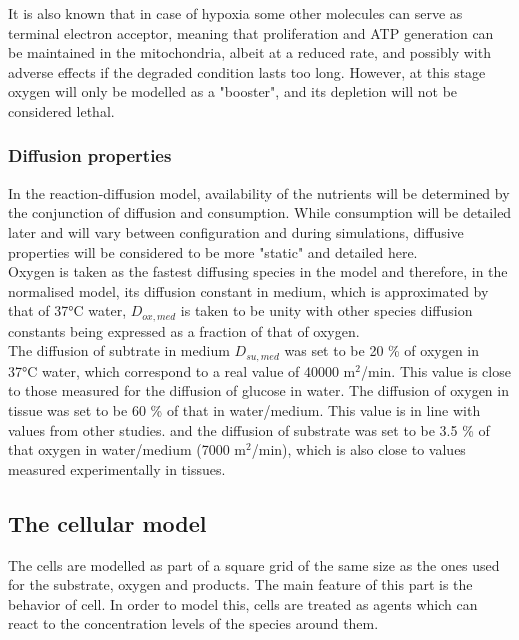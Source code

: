 \documentclass[11pt,a4paper]{article}
\begin{document}
It is also known that in case of hypoxia some other molecules can serve as terminal electron acceptor, meaning that proliferation and ATP generation can be maintained in the mitochondria, albeit at a reduced rate, and possibly with adverse effects if the degraded condition lasts too long.\cite{Spinelli2021} However, at this stage oxygen will only be modelled as a "booster", and its depletion will not be considered lethal.\\



\subsubsection{Diffusion properties}
In the reaction-diffusion model, availability of the nutrients will be determined by the conjunction of diffusion and consumption. While consumption will be detailed later and will vary between configuration and during simulations, diffusive properties will be considered to be more "static" and detailed here.\\

Oxygen is taken as the fastest diffusing species in the model and therefore, in the normalised model, its diffusion constant in medium, which is approximated by that of 37°C water, $D_{ox,med}$ is taken to be unity with other species diffusion constants being expressed as a fraction of that of oxygen.\\

The diffusion of subtrate in medium $D_{su,med}$ was set to be 20 \% of oxygen in 37°C water, which correspond to a real value of 40000 \textmu m$^2$/min. This value is close to those measured for the diffusion of glucose in water.\cite{Hober1947} The diffusion of oxygen in tissue was set to be 60 \% of that in water/medium. This value is in line with values from other studies.\cite{Mao2018}\cite{Grote1977} and the diffusion of substrate was set to be 3.5 \% of that oxygen in water/medium (7000 \textmu m$^2$/min), which is also close to values measured experimentally in tissues.\cite{Grote1977}\cite{Pfeuffer2000}\\


\subsection{The cellular model}
The cells are modelled as part of a square grid of the same size as the ones used for the substrate, oxygen and products. The main feature of this part is the behavior of cell. In order to model this, cells  are treated as agents which can react to the concentration levels of the species around them.\\
\end{document}
